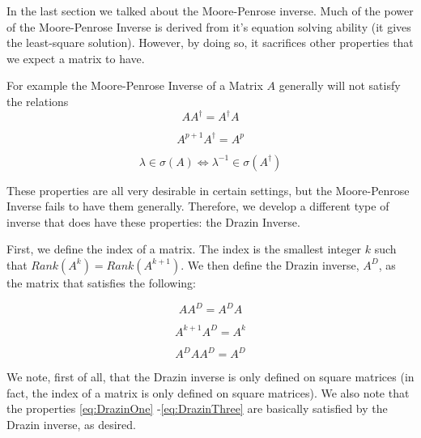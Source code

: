 

In the last section we talked about the Moore-Penrose inverse. Much of the power of the Moore-Penrose Inverse is derived from it's equation solving ability (it gives the least-square solution). However, by doing so, it sacrifices other properties that we expect a matrix to have.

For example the Moore-Penrose Inverse of a Matrix $A$ generally will not satisfy the relations
\begin{equation} \label{eq:DrazinOne}
A A^\dagger = A^\dagger A
\end{equation}

\begin{equation} \label{eq:DrazinTwo}
A^{p+1} A^\dagger = A^p
\end{equation}

\begin{equation} \label{eq:DrazinThree}
\lambda \in \sigma(A) \iff \lambda^{-1} \in \sigma(A^\dagger)
\end{equation}

These properties are all very desirable in certain settings, but the Moore-Penrose Inverse fails to have them generally. Therefore, we develop a different type of inverse that does have these properties: the Drazin Inverse.

First, we define the index of a matrix. The index is the smallest integer $k$ such that $Rank(A^k) = Rank(A^{k+1})$. We then define the Drazin inverse, $A^D$, as the matrix that satisfies the following:

\begin{equation} \label{eq:DrazinCondOne}
A A^D = A^D A
\end{equation}

\begin{equation} \label{eq:DrazinCondTwo}
A^{k+1} A^D = A^k
\end{equation}

\begin{equation} \label{eq:DrazinCondThree}
A^D A A^D = A^D
\end{equation}

We note, first of all, that the Drazin inverse is only defined on square matrices (in fact, the index of a matrix is only defined on square matrices). We also note that the properties \ref{eq:DrazinOne} -\ref{eq:DrazinThree} are basically satisfied by the Drazin inverse, as desired.

